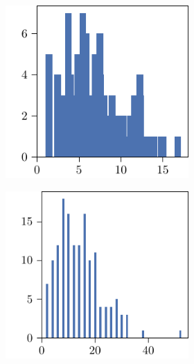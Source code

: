 \begin{figure}[p]
\begin{subfigure}{\textwidth}
\begin{subfigure}{\mymultiouter}
    \end{subfigure}
    \begin{subfigure}{\mymultiouter}
        \centering
          \includegraphics[width=\mymultiinner]{figures/new/eucledian-princess-permutation-retraining}
      \end{subfigure}
  \end{subfigure}
  \centering
  \begin{subfigure}{\textwidth}
    \centering
    \begin{subfigure}{\mymultiouter}
        \centering
          \includegraphics[width=\mymultiinner]{figures/new/manhattan-princess-qlibra-permutation}
    \end{subfigure}
    \begin{subfigure}{\mymultiouter}
        \centering

\end{subfigure}
\end{subfigure}
\end{figure}

